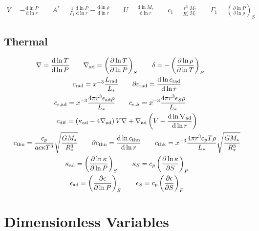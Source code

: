 \documentclass[fleqn]{article}
\newcommand{\diff}{\mathrm{d}}
\newcommand{\As}{A^{\ast}}
\newcommand{\nabad}{\nabla_{\rm ad}}
\newcommand{\kapad}{\kappa_{\rm ad}}
\newcommand{\kapS}{\kappa_{S}}
\newcommand{\epsad}{\epsilon_{\rm ad}}
\newcommand{\epsS}{\epsilon_{S}}
\newcommand{\crad}{c_{\rm rad}}
\newcommand{\cepsad}{c_{\epsilon,{\rm ad}}}
\newcommand{\cepsS}{c_{\epsilon,S}}
\newcommand{\cdif}{c_{\rm dif}}
\newcommand{\cthn}{c_{\rm thn}}
\newcommand{\cthk}{c_{\rm thk}}
\newcommand{\Rstar}{R_{\ast}}
\newcommand{\Mstar}{M_{\ast}}
\newcommand{\Lrad}{L_{\rm rad}}
\newcommand{\Lstar}{L_{\ast}}
\begin{document}
\begin{gather*}
V = -\frac{\diff \ln P}{\diff \ln r} \qquad
\As = \frac{1}{\Gamma_{1}} \frac{\diff \ln P}{\diff \ln r} - \frac{\diff \ln \rho}{\diff \ln r} \qquad
U = \frac{\diff \ln M_{r}}{\diff \ln r} \qquad
c_1 = \frac{r^{3}}{\Rstar^{3}} \frac{\Mstar}{M_{r}} \qquad
\Gamma_{1} = \left( \frac{\partial \ln P}{\partial \ln \rho} \right)_{S}
\end{gather*}

\subsection*{Thermal}

\begin{gather*}
\nabla = \frac{\diff \ln T}{\diff \ln P} \qquad
\nabad = \left( \frac{\partial \ln T}{\partial \ln P} \right)_{S} \qquad
\delta = - \left( \frac{\partial \ln \rho}{\partial \ln T} \right)_{P} \qquad \\
\crad = x^{-3} \frac{\Lrad}{\Lstar} \qquad
\partial\crad = \frac{\diff \ln \crad}{\diff \ln r} \\
\cepsad = x^{-3} \frac{4\pi r^{3} \epsad \rho}{\Lstar} \qquad
\cepsS = x^{-3} \frac{4\pi r^{3} \epsS \rho}{\Lstar} \qquad \\
\cdif = \left( \kapad - 4 \nabad \right) V \nabla + \nabad \left(V + \frac{\diff \ln \nabad}{\diff \ln r} \right) \\
\cthn = \frac{c_{p}}{a c \kappa T^{3}} \sqrt{\frac{G\Mstar}{\Rstar^{3}}} \qquad
\partial\cthn = \frac{\diff \ln \cthn}{\diff \ln r} \qquad
\cthk = x^{-3} \frac{4\pi r^{3} c_{p} T \rho}{\Lstar} \sqrt{\frac{G\Mstar}{\Rstar^{3}}} \\
\kapad = \left( \frac{\partial \ln \kappa}{\partial \ln P} \right)_{S} \qquad
\kapS = c_{p} \left( \frac{\partial \ln \kappa}{\partial S} \right)_{P} \\
\epsad = \left( \frac{\partial \epsilon}{\partial \ln P} \right)_{S} \qquad
\epsS = c_{p} \left( \frac{\partial \epsilon}{\partial S} \right)_{P}
\end{gather*}


\section*{Dimensionless Variables}
\end{document}
